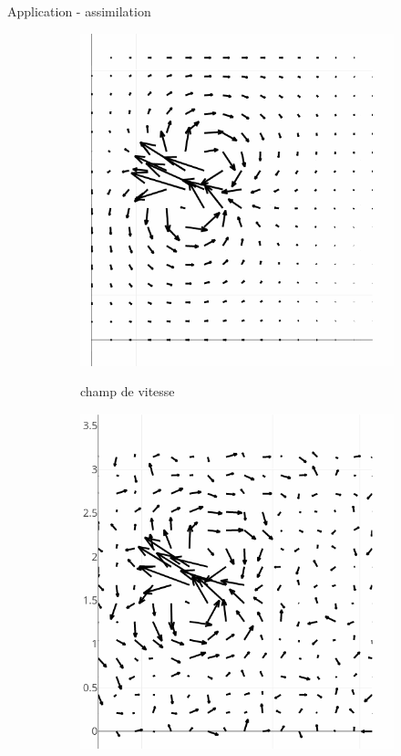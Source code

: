 \documentclass[aspectratio=169]{beamer} %
\begin{document}
\begin{frame}{Application - assimilation}
\begin{figure}[t]
\begin{subfigure}{0.3\textwidth}
            {\includegraphics[height=0.3\textheight]{../../conference/images/dipole_estimate/obs_no_noise/obs_no_noise-0.png}}
            \caption*{\tiny champ de vitesse}
        \end{subfigure}
        \begin{subfigure}{0.3\textwidth}
            \centering
            {\includegraphics[height=0.3\textheight]{../../conference/images/dipole_estimate/obs_noise/obs_noise-0.png}}

\end{subfigure}
\end{figure}
\end{frame}
\end{document}
